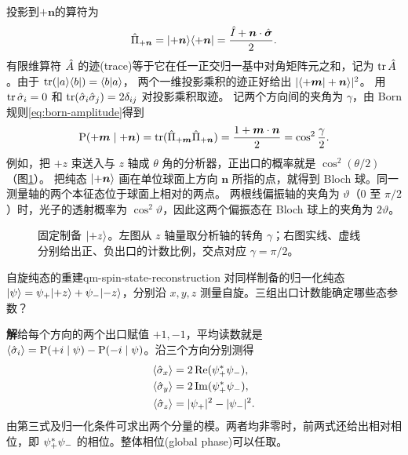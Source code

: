 投影到$+\bm n$的算符为
\begin{equation}
    \hat{\Pi}_{+\bm n} = \lvert+\bm n\rangle\langle+\bm n\rvert
    = \frac{\hat{I} + \bm n \cdot \hat{\bm{\sigma}}}{2}.
\end{equation}
有限维算符 $\hat{A}$ 的迹(trace)等于它在任一正交归一基中对角矩阵元之和，记为 $\operatorname{tr}\hat{A}$。由于 $\operatorname{tr}(\lvert a\rangle\langle b\rvert) = \langle b\vert a\rangle$，
两个一维投影乘积的迹正好给出 $\lvert\langle+\bm m\vert+\bm n\rangle\rvert^2$。
用 $\operatorname{tr}\hat{\sigma}_i = 0$ 和 $\operatorname{tr}(\hat{\sigma}_i\hat{\sigma}_j) = 2\delta_{ij}$ 对投影乘积取迹。
记两个方向间的夹角为 $\gamma$，由 Born 规则\eqref{eq:born-amplitude}得到
\begin{equation}
    \operatorname{P}(+\bm m \mid +\bm n) = \operatorname{tr}(\hat{\Pi}_{+\bm m}\hat{\Pi}_{+\bm n})
        = \frac{1 + \bm m \cdot \bm n}{2} = \cos^2\frac{\gamma}{2}.
\end{equation}
例如，把 $+z$ 束送入与 $z$ 轴成 $\theta$ 角的分析器，正出口的概率就是 $\cos^2(\theta/2)$（图\ref{fig:spin-angle-readout}）。
把纯态 $\lvert+\bm n\rangle$ 画在单位球面上方向 $\bm n$ 所指的点，就得到 Bloch 球。同一测量轴的两个本征态位于球面上相对的两点。
两根线偏振轴的夹角为 $\vartheta$（$0$ 至 $\pi/2$）时，光子的透射概率为 $\cos^2\vartheta$，因此这两个偏振态在 Bloch 球上的夹角为 $2\vartheta$。

\begin{figure}[htbp]
    \centering
    \caption{固定制备 $\lvert+z\rangle$。左图从 $z$ 轴量取分析轴的转角 $\gamma$；右图实线、虚线分别给出正、负出口的计数比例，交点对应 $\gamma = \pi/2$。}
    \label{fig:spin-angle-readout}
\end{figure}

\begin{example}{自旋纯态的重建}{qm-spin-state-reconstruction}
    对同样制备的归一化纯态 $\lvert\psi\rangle = \psi_+\lvert+z\rangle + \psi_-\lvert-z\rangle$，分别沿 $x,y,z$ 测量自旋。三组出口计数能确定哪些态参数？

    \par\smallskip\textbf{解}\quad 给每个方向的两个出口赋值 $+1,-1$，平均读数就是 $\langle\hat{\sigma}_i\rangle = \operatorname{P}(+i \mid \psi) - \operatorname{P}(-i \mid \psi)$。沿三个方向分别测得
    \begin{subequations}
        \begin{align}
            \langle\hat{\sigma}_x\rangle &= 2\operatorname{Re}(\psi_+^\ast \psi_-),\\
            \langle\hat{\sigma}_y\rangle &= 2\operatorname{Im}(\psi_+^\ast \psi_-),\\
            \langle\hat{\sigma}_z\rangle &= \lvert\psi_+\rvert^2 - \lvert\psi_-\rvert^2.
        \end{align}
    \end{subequations}
    由第三式及归一化条件可求出两个分量的模。两者均非零时，前两式还给出相对相位，即 $\psi_+^\ast\psi_-$ 的相位。整体相位(global phase)可以任取。
\end{example}

